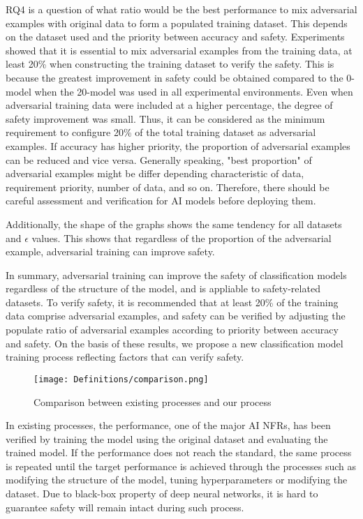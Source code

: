 \documentclass[symmetry,article,submit,moreauthors,pdftex]{Definitions/mdpi}
\begin{document}
RQ4 is a question of what ratio would be the best performance to mix adversarial examples with original data to form a populated training dataset.
This depends on the dataset used and the priority between accuracy and safety. 
Experiments showed that it is essential to mix adversarial examples from the training data, at least 20\% when constructing the training dataset to verify the safety.
This is because the greatest improvement in safety could be obtained compared to the 0-model when the 20-model was used in all experimental environments.
Even when adversarial training data were included at a higher percentage, the degree of safety improvement was small. Thus, it can be considered as the minimum requirement to configure 20\% of the total training dataset as adversarial examples. 
If accuracy has higher priority, the proportion of adversarial examples can be reduced and vice versa. Generally speaking, "best proportion" of adversarial examples might be differ depending characteristic of data, requirement priority, number of data, and so on. Therefore, there should be careful assessment and verification for AI models before deploying them.

Additionally, the shape of the graphs shows the same tendency for all datasets and \begin{math}\epsilon\end{math} values.
This shows that regardless of the proportion of the adversarial example, adversarial training can improve safety.

In summary, adversarial training can improve the safety of classification models regardless of the structure of the model, and is appliable to safety-related datasets.
To verify safety, it is recommended that at least 20\% of the training data comprise adversarial examples, and safety can be verified by adjusting the populate ratio of adversarial examples according to priority between accuracy and safety.
On the basis of these results, we propose a new classification model training process reflecting factors that can verify safety.

\begin{figure}[H]
    \texttt{[image: Definitions/comparison.png]}
    \caption{Comparison between existing processes and our process\label{comparison}}
\end{figure} 

In existing processes, the performance, one of the major AI NFRs, has been verified by training the model using the original dataset and evaluating the trained model.
If the performance does not reach the standard, the same process is repeated until the target performance is achieved through the processes such as modifying the structure of the model, tuning hyperparameters or modifying the dataset.
Due to black-box property of deep neural networks, it is hard to guarantee safety will remain intact  during such process.
\end{document}
